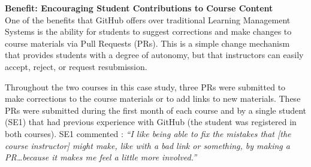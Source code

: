 

\textbf{Benefit: Encouraging Student Contributions to Course Content} \\
One of the benefits that GitHub offers over traditional Learning Management Systems is the ability for students to suggest corrections and make changes to course materials via Pull Requests (PRs). This is a simple change mechanism that provides students with a degree of autonomy, but that instructors can easily accept, reject, or request resubmission.

Throughout the two courses in this case study, three PRs were submitted to make corrections to the course materials or to add links to new materials. These PRs were submitted during the first month of each course and by a single student (SE1) that had previous experience with GitHub (the student was registered in both courses). SE1 commented : \textit{``I like being able to fix the mistakes that [the course instructor] might make, like with a bad link or something, by making a PR\ldots because it makes me feel a little more involved.''}


